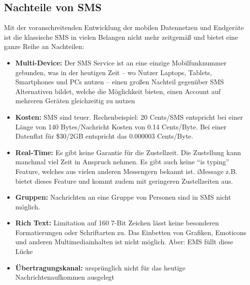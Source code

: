 \documentclass[german,12pt,a4paper]{article}
\begin{document}

\subsection{Nachteile von SMS}
Mit der voranschreitenden Entwicklung der mobilen Datennetzen und Endgeräte ist die klassische SMS in vielen Belangen
nicht mehr zeitgemäß und bietet eine ganze Reihe an Nachteilen:
\begin{itemize}
	\item \textbf{Multi-Device:} Der SMS Service ist an eine einzige Mobilfunknummer gebunden, was in der heutigen Zeit -- 
		wo Nutzer Laptops, Tablets, Smartphones und PCs nutzen -- einen großen Nachteil gegenüber SMS Alternativen 
		bildet, welche die Möglichkeit bieten, einen Account auf mehreren Geräten gleichzeitig zu nutzen
	\item \textbf{Kosten:} SMS sind teuer. Rechenbeispiel: 20 Cents/SMS entspricht bei einer Länge von 140 Bytes/Nachricht Kosten 
		von 0.14 Cents/Byte. Bei einer Datenflat für \$30/2GB entspricht das 0.000003 Cents/Byte.
	\item \textbf{Real-Time:} Es gibt keine Garantie für die Zustellzeit. Die Zustellung kann manchmal viel Zeit in Anspruch nehmen. 
		Es gibt auch keine ``is typing'' Feature, welches aus vielen anderen Messengern bekannt ist. iMessage z.B. bietet 
		dieses Feature und kommt zudem mit geringeren Zustellzeiten aus.
	\item \textbf{Gruppen:} Nachrichten an eine Gruppe von Personen sind in SMS nicht möglich.
	\item \textbf{Rich Text:} Limitation auf 160 7-Bit Zeichen lässt keine besonderen Formatierungen oder Schriftarten zu. Das Einbetten
		von Grafiken, Emoticons und anderen Multimediainhalten ist nicht möglich. Aber: EMS füllt diese Lücke
	\item \textbf{Übertragungskanal:} ursprünglich nicht für das heutige 
		Nachrichtenaufkommen ausgelegt
\end{itemize}
\end{document}

